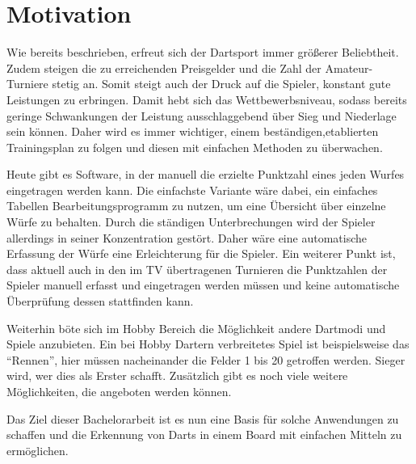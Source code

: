 \section*{Motivation}
\label{sec:motivation}
Wie bereits beschrieben, erfreut sich der Dartsport immer größerer Beliebtheit. Zudem steigen die zu erreichenden Preisgelder und die Zahl der Amateur-Turniere stetig an. Somit steigt auch der Druck auf die Spieler,  konstant gute Leistungen zu erbringen. Damit hebt sich das Wettbewerbsniveau, sodass bereits geringe Schwankungen der Leistung ausschlaggebend über Sieg und Niederlage sein können. Daher wird es immer wichtiger, einem beständigen,etablierten Trainingsplan zu folgen und diesen mit einfachen Methoden zu überwachen. 

Heute gibt es Software, in der manuell die erzielte Punktzahl eines jeden Wurfes eingetragen werden kann. Die einfachste Variante wäre dabei, ein einfaches Tabellen Bearbeitungsprogramm zu nutzen, um eine Übersicht über einzelne Würfe zu behalten. 
Durch die ständigen Unterbrechungen wird der Spieler allerdings in seiner Konzentration gestört. 
Daher wäre eine automatische Erfassung der Würfe eine Erleichterung für die Spieler. Ein weiterer Punkt ist, dass aktuell auch in den im TV übertragenen Turnieren die Punktzahlen der Spieler manuell erfasst und eingetragen werden müssen und keine automatische Überprüfung dessen stattfinden kann. 

Weiterhin böte sich im Hobby Bereich die Möglichkeit andere Dartmodi und Spiele anzubieten. Ein bei Hobby Dartern verbreitetes Spiel ist beispielsweise das "`Rennen"', hier müssen nacheinander die Felder 1 bis 20 getroffen werden. Sieger wird, wer dies als Erster schafft. Zusätzlich gibt es noch viele weitere Möglichkeiten, die angeboten werden können.

Das Ziel dieser Bachelorarbeit ist es nun eine Basis für solche Anwendungen zu schaffen und die Erkennung von Darts in einem Board mit einfachen Mitteln zu ermöglichen.